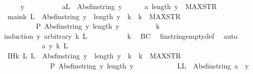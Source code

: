 \begin{isabellebody}
\ \ \isamarkupfalse%
\ \ y\isanewline
\ \ \isamarkupfalse%
\ {\isacharminus}\isanewline
\ \ \ \ \isamarkupfalse%
\ a{}{\isacharcolon}{\isachardoublequoteopen}L\ {\isacharequal}\ Abs{\isacharunderscore}fin{\isacharunderscore}string\ y{\isachardoublequoteclose}\isanewline
\ \ \ \ \isamarkupfalse%
\ a{}{\isacharcolon}{\isachardoublequoteopen}\ length\ y\ {\isasymle}\ MAX{\isacharunderscore}STR\ {\isachardoublequoteclose}\isanewline
\ \ \ \ \isamarkupfalse%
\ main{\isacharcolon}{\isachardoublequoteopen}{\isasymAnd}k{\isachardot}\ L\ {\isacharequal}\ Abs{\isacharunderscore}fin{\isacharunderscore}string\ y\ {\isasymLongrightarrow}\ length\ y\ {\isacharequal}\ k\ {\isasymLongrightarrow}\ k\ {\isasymle}\ MAX{\isacharunderscore}STR\ \isanewline
\ \ \ \ \ \ \ \ {\isasymLongrightarrow}\ P\ {\isacharparenleft}Abs{\isacharunderscore}fin{\isacharunderscore}string\ y{\isacharparenright}\ {\isacharparenleft}length\ y{\isacharparenright}{\isachardoublequoteclose}\ \isanewline
\ \ \ \ \ \ \isamarkupfalse%
\ \ k\isanewline
\ \ \ \ \ \ \ \ \isamarkupfalse%
{\isacharparenleft}induction\ y\ arbitrary{\isacharcolon}\ k\ L{\isacharparenright}\isanewline
\ \ \ \ \ \ \ \ \isamarkupfalse%
\ \ k\ \isamarkupfalse%
\ BC\ \isamarkupfalse%
\ fin{\isacharunderscore}string{\isacharunderscore}empty{\isacharunderscore}def\ \isamarkupfalse%
\ auto\isanewline
\ \ \ \ \ \ \ \ \isamarkupfalse%
\ \ a\ y\ k\ L\isanewline
\ \ \ \ \ \ \ \ \isamarkupfalse%
\ {\isacharminus}\isanewline
\ \ \ \ \ \ \ \ \ \ \isamarkupfalse%
\ IH{\isacharcolon}{\isachardoublequoteopen}{\isacharparenleft}{\isasymAnd}k\ L{\isachardot}\ L\ {\isacharequal}\ Abs{\isacharunderscore}fin{\isacharunderscore}string\ y\ {\isasymLongrightarrow}\ length\ y\ {\isacharequal}\ k\ {\isasymLongrightarrow}\ k\ {\isasymle}\ MAX{\isacharunderscore}STR\ \isanewline
\ \ \ \ \ \ \ \ \ \ \ \ {\isasymLongrightarrow}\ P\ {\isacharparenleft}Abs{\isacharunderscore}fin{\isacharunderscore}string\ y{\isacharparenright}\ {\isacharparenleft}length\ y{\isacharparenright}{\isacharparenright}{\isachardoublequoteclose}\isanewline
\ \ \ \ \ \ \ \ \ \ \isamarkupfalse%
\ L{\isacharcolon}{\isachardoublequoteopen}L\ {\isacharequal}\ Abs{\isacharunderscore}fin{\isacharunderscore}string\ {\isacharparenleft}a\ {\isacharhash}\ y{\isacharparenright}{\isachardoublequoteclose}\isanewline

\end{isabellebody}
